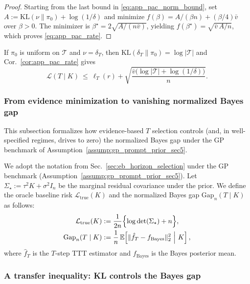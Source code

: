 \documentclass{article}
\theoremstyle{plain}
\theoremstyle{definition}
\theoremstyle{remark}
\begin{document}
\begin{proof}
Starting from the last bound in \eqref{eq:app_pac_norm_bound}, set
$A:=\mathrm{KL}(\nu\|\pi_0)+\log(1/\delta)$ and minimize
$f(\beta)=A/(\beta n)+(\beta/4)\bar v$ over $\beta>0$.
The minimizer is $\beta^\star = 2\sqrt{A/(n\bar v)}$, yielding
$f(\beta^\star)=\sqrt{\bar v\,A/n}$, which proves \eqref{eq:app_pac_rate}.
\end{proof}



If $\pi_0$ is uniform on $\mathcal T$ and $\nu=\delta_T$, then
$\mathrm{KL}(\delta_T\|\pi_0)=\log|\mathcal T|$ and Cor.~\ref{cor:app_pac_rate} gives
\begin{equation}
    \mathcal L(T\mid K) \ \le\ \ell_T(r) 
    + \sqrt{\frac{\bar v\bigl(\log|\mathcal T|+\log(1/\delta)\bigr)}{n}}.
\label{eq:app_point_uniform}
\end{equation}


\subsubsection{From evidence minimization to vanishing normalized Bayes gap}
\label{app:eb_to_bayes_gap}

This subsection formalizes how evidence-based $T$ selection controls (and, in well-specified regimes,
drives to zero) the normalized Bayes gap under the GP benchmark of
Assumption~\ref{assump:gp_prompt_prior_sec5}.


We adopt the notation from Sec.~\ref{sec:eb_horizon_selection} under the GP benchmark (Assumption~\ref{assump:gp_prompt_prior_sec5}).
Let $\Sigma_\star:=\tau^2 K+\sigma^2 I_n$ be the marginal residual covariance under the prior.
We define the oracle baseline risk $\mathcal L_{\mathrm{true}}(K)$ and the normalized Bayes gap $\mathrm{Gap}_n(T\mid K)$ as follows:
\begin{align}
\mathcal L_{\mathrm{true}}(K)&:=\frac{1}{2n}\Bigl\{\log\det(\Sigma_\star)+n\Bigr\}, \label{eq:app_Ltrue_def}\\
\mathrm{Gap}_n(T\mid K)
&:=
\frac1n\,\mathbb E\!\left[\|\hat f_T-f_{\mathrm{Bayes}}\|_2^2\ \middle|\ K\right], \label{eq:app_norm_gap_def}
\end{align}
where $\hat f_T$ is the $T$-step TTT estimator and $f_{\mathrm{Bayes}}$ is the Bayes posterior mean.

\subsubsection{A transfer inequality: KL controls the Bayes gap}
\end{document}
